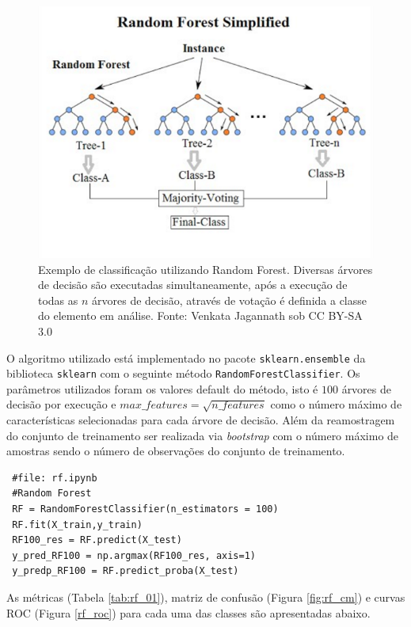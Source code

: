 \documentclass[
	article,			%
	11pt,				%
	oneside,			%
	a4paper,			%
	english,			%
	brazil,				%
	sumario=tradicional
	]{abntex2}
\begin{document}
\begin{figure}[H]
 \centering
 \includegraphics[scale=0.6]{fig/rf_alg.png}
 \caption{Exemplo de classificação utilizando Random Forest. Diversas árvores de decisão são executadas simultaneamente, após a execução de todas as $n$ árvores de decisão, através de votação é definida a classe do elemento em análise. Fonte: Venkata Jagannath sob CC BY-SA 3.0}
 \label{fig:rf_alg}
\end{figure}

O algoritmo utilizado está implementado no pacote \verb|sklearn.ensemble| da biblioteca \verb|sklearn| com o seguinte método \verb|RandomForestClassifier|. Os parâmetros utilizados foram os valores default do método, isto é $100$ árvores de decisão por execução e $max\_features=\sqrt{n\_features}$ como o número máximo de características selecionadas para cada árvore de decisão. Além da reamostragem do conjunto de treinamento ser realizada via \textit{bootstrap} com o número máximo de amostras sendo o número de observações do conjunto de treinamento.

\begin{verbatim}
 #file: rf.ipynb
 #Random Forest
 RF = RandomForestClassifier(n_estimators = 100)
 RF.fit(X_train,y_train)
 RF100_res = RF.predict(X_test)
 y_pred_RF100 = np.argmax(RF100_res, axis=1)
 y_predp_RF100 = RF.predict_proba(X_test)
\end{verbatim}


As métricas (Tabela \ref{tab:rf_01}), matriz de confusão (Figura \ref{fig:rf_cm}) e curvas ROC (Figura \ref{rf_roc}) para cada uma das classes são apresentadas abaixo.
\end{document}
